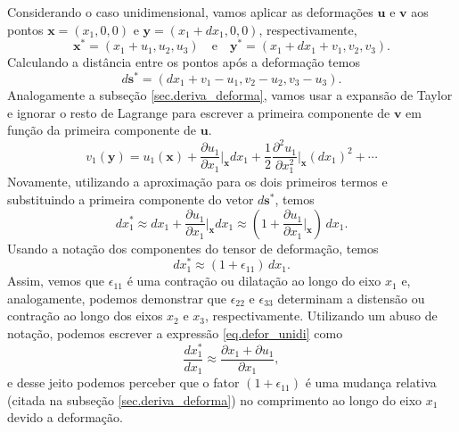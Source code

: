 Considerando o caso unidimensional, vamos aplicar as deforma\c{c}\~oes $\mathbf{u}$ e $\mathbf{v}$ aos pontos $\mathbf{x}=(x_1,0,0)$ e $\mathbf{y}=(x_1+dx_1,0,0)$, respectivamente,
\begin{equation*}
\mathbf{x}^*=(x_1+u_1,u_2,u_3)\quad\text{e}\quad\mathbf{y}^*=(x_1+dx_1+v_1,v_2,v_3).
\end{equation*}
Calculando a dist\^ancia entre os pontos ap\'os a deforma\c{c}\~ao temos
\begin{equation*}
d\mathbf{s}^*=(dx_1+v_1-u_1,v_2-u_2,v_3-u_3).
\end{equation*}
Analogamente a subse\c{c}\~ao \ref{sec.deriva_deforma}, vamos usar a expans\~ao de Taylor e ignorar o resto de Lagrange para escrever a primeira componente de $\mathbf{v}$ em fun\c{c}\~ao da primeira componente de $\mathbf{u}$. 
\begin{equation*}
v_1(\mathbf{y})=u_1(\mathbf{x})+\frac{\partial u_1}{\partial x_1}\Bigg\vert_{\mathbf{x}}dx_1+\frac{1}{2}\frac{\partial^2 u_1}{\partial x_1^2}\Bigg\vert_{\mathbf{x}}(dx_1)^2+\cdots
\end{equation*}
Novamente, utilizando a aproxima\c{c}\~ao para os dois primeiros termos e substituindo a primeira componente do vetor $d\mathbf{s}^*$, temos
\begin{equation}
dx_1^*\approx dx_1+\frac{\partial u_1}{\partial x_1}\Bigg\vert_{\mathbf{x}}dx_1\approx \left(1+\frac{\partial u_1}{\partial x_1}\Bigg\vert_{\mathbf{x}}\right)\,dx_1. 
\end{equation}
Usando a nota\c{c}\~ao dos componentes do tensor de deforma\c{c}\~ao, temos
\begin{equation}\label{eq.defor_unidi}
dx_1^*\approx(1+\epsilon_{11})\,dx_1.
\end{equation} 
Assim, vemos que $\epsilon_{11}$ \'e uma contra\c{c}\~ao ou dilata\c{c}\~ao ao longo do eixo $x_1$ e, analogamente, podemos demonstrar que $\epsilon_{22}$ e $\epsilon_{33}$ determinam a distens\~ao ou contra\c{c}\~ao ao longo dos eixos $x_2$ e $x_3$, respectivamente.
Utilizando um abuso de nota\c{c}\~ao, podemos escrever a express\~ao \ref{eq.defor_unidi} como
\begin{equation*}
\frac{dx_1^*}{dx_1}\approx \frac{\partial x_1+\partial u_1}{\partial x_1},
\end{equation*}
e desse jeito podemos perceber que o fator $(1+\epsilon_{11})$ \'e uma mudan\c{c}a relativa (citada na subse\c{c}\~ao \ref{sec.deriva_deforma}) no comprimento ao longo do eixo $x_1$ devido a deforma\c{c}\~ao.

